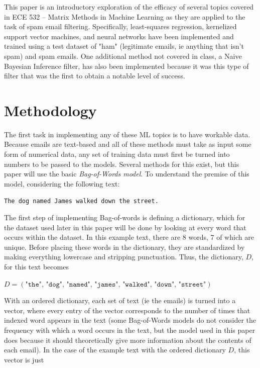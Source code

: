 \documentclass{article}
\begin{document}
This paper is an introductory exploration of the efficacy of several topics covered in ECE 532 -- Matrix Methods in Machine Learning as they are applied to the task of spam email filtering. Specifically, least-squares regression, kernelized support vector machines, and neural networks have been implemented and trained using a test dataset of "ham" (legitimate emails, ie anything that isn't spam) and spam emails. One additional method not covered in class, a Naive Bayesian Inference filter, has also been implemented because it was this type of filter that was the first to obtain a notable level of success.

\section{Methodology}
The first task in implementing any of these ML topics is to have workable data. Because emails are text-based and all of these methods must take as input some form of numerical data, any set of training data must first be turned into numbers to be passed to the models. Several methods for this exist, but this paper will use the basic \emph{Bag-of-Words model}. To understand the premise of this model, considering the following text:

\begin{center}
\texttt{The dog named James walked down the street.}
\end{center}

The first step of implementing Bag-of-words is defining a dictionary, which for the dataset used later in this paper will be done by looking at every word that occurs within the dataset. In this example text, there are 8 words, 7 of which are unique. Before placing these words in the dictionary, they are standardized by making everything lowercase and stripping punctuation. Thus, the dictionary, $D$, for this text becomes

\begin{center}
$D = (\texttt{"the", "dog", "named", "james", "walked", "down", "street"})$
\end{center}

With an ordered dictionary, each set of text (ie the emails) is turned into a vector, where every entry of the vector corresponds to the number of times that indexed word appears in the text (some Bag-of-Words models do not consider the frequency with which a word occurs in the text, but the model used in this paper does because it should theoretically give more information about the contents of each email). In the case of the example text with the ordered dictionary $D$, this vector is just
\end{document}
